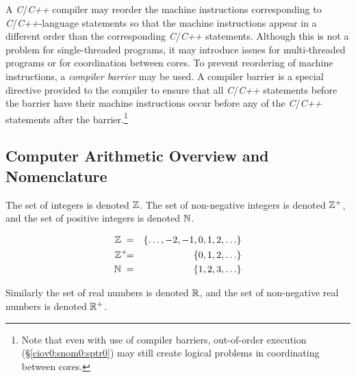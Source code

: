 A \emph{C}/\emph{C++} compiler may reorder the machine 
instructions corresponding to \emph{C}/\emph{C++}-language 
statements so that the machine instructions appear in a 
different order than the corresponding \emph{C}/\emph{C++} 
statements.  Although this is not a problem for 
single-threaded programs, it may introduce issues for 
multi-threaded programs or for coordination between cores.  
To prevent reordering of machine instructions, a 
\emph{compiler barrier} may be used.  
A compiler barrier is a special directive provided to the 
compiler to ensure that all \emph{C}/\emph{C++} statements 
before the barrier have their machine instructions occur 
before any of the \emph{C}/\emph{C++} statements after the 
barrier.\footnote{Note that even with use of compiler 
barriers, out-of-order execution 
(\S{}\ref{ciov0:snom0:sptr0}) may still create logical 
problems in coordinating between cores.} 



\subsection{Computer Arithmetic Overview and Nomenclature}
\label{cldd0:snom0:scan0}

The set of integers is denoted 
${\mathbb{Z}}{}$\@.  The set of 
non-negative integers is denoted 
${\mathbb{Z}^+}{}$, and 
the set of positive integers is denoted 
${\mathbb{N}}{}$.  

\begin{eqnarray}
\label{eq:ciov0:snom0:scan0:01}
{\mathbb{Z}}{}   \;    & = & \{ \ldots , -2, -1, 0, 1, 2, \ldots \} \\
\label{eq:ciov0:snom0:scan0:02}
{\mathbb{Z}^+}{} \!\!\!\!\; & = & \{ 0, 1, 2, \ldots \}         \\
\label{eq:ciov0:snom0:scan0:03}
{\mathbb{N}}{}  \;  & = & \{ 1, 2, 3, \ldots \}
\end{eqnarray}

Similarly the set of real numbers is denoted 
${\mathbb{R}}$, and the set of 
non-negative real numbers is denoted 
${\mathbb{R}^+}$.  

